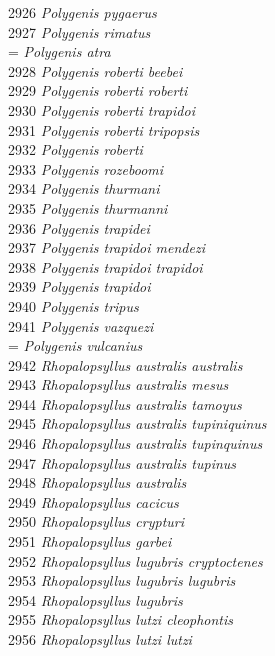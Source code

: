 \documentclass[
]{article}
\begin{document}
2926 \emph{Polygenis pygaerus}\\
2927 \emph{Polygenis rimatus}\\
= \emph{Polygenis atra}\\
2928 \emph{Polygenis roberti beebei}\\
2929 \emph{Polygenis roberti roberti}\\
2930 \emph{Polygenis roberti trapidoi}\\
2931 \emph{Polygenis roberti tripopsis}\\
2932 \emph{Polygenis roberti}\\
2933 \emph{Polygenis rozeboomi}\\
2934 \emph{Polygenis thurmani}\\
2935 \emph{Polygenis thurmanni}\\
2936 \emph{Polygenis trapidei}\\
2937 \emph{Polygenis trapidoi mendezi}\\
2938 \emph{Polygenis trapidoi trapidoi}\\
2939 \emph{Polygenis trapidoi}\\
2940 \emph{Polygenis tripus}\\
2941 \emph{Polygenis vazquezi}\\
= \emph{Polygenis vulcanius}\\
2942 \emph{Rhopalopsyllus australis australis}\\
2943 \emph{Rhopalopsyllus australis mesus}\\
2944 \emph{Rhopalopsyllus australis tamoyus}\\
2945 \emph{Rhopalopsyllus australis tupiniquinus}\\
2946 \emph{Rhopalopsyllus australis tupinquinus}\\
2947 \emph{Rhopalopsyllus australis tupinus}\\
2948 \emph{Rhopalopsyllus australis}\\
2949 \emph{Rhopalopsyllus cacicus}\\
2950 \emph{Rhopalopsyllus crypturi}\\
2951 \emph{Rhopalopsyllus garbei}\\
2952 \emph{Rhopalopsyllus lugubris cryptoctenes}\\
2953 \emph{Rhopalopsyllus lugubris lugubris}\\
2954 \emph{Rhopalopsyllus lugubris}\\
2955 \emph{Rhopalopsyllus lutzi cleophontis}\\
2956 \emph{Rhopalopsyllus lutzi lutzi}\\
\end{document}
